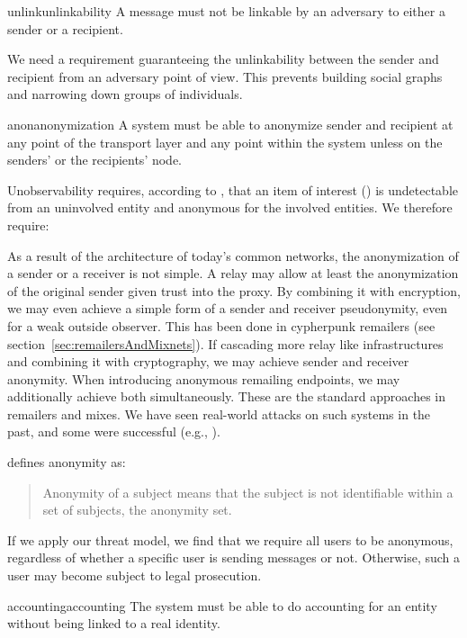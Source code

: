 \begin{requirement}{unlink}{unlinkability}
	A message must not be linkable by an adversary to either a sender or a recipient.
\end{requirement}

We need a requirement guaranteeing the unlinkability between the sender and recipient from an adversary point of view. This prevents building social graphs and narrowing down groups of individuals.

\begin{requirement}{anon}{anonymization}
	A system must be able to anonymize sender and recipient at any point of the transport layer and any point within the system unless on the senders' or the recipients' node.
\end{requirement}

Unobservability requires, according to \cite{anonTerminology}, that an item of interest () is undetectable from an uninvolved entity and anonymous for the involved entities. We therefore require: 

As a result of the architecture of today's common networks, the anonymization of a sender or a receiver is not simple. A relay may allow at least the anonymization of the original sender given trust into the proxy. By combining it with encryption, we may even achieve a simple form of a sender and receiver pseudonymity, even for a weak outside observer. This has been done in cypherpunk remailers (see section~\ref{sec:remailersAndMixnets}). If cascading more relay like infrastructures and combining it with cryptography, we may achieve sender and receiver anonymity. When introducing anonymous remailing endpoints, we may additionally achieve both simultaneously. These are the standard approaches in remailers and mixes. We have seen real-world attacks on such systems in the past, and some were successful (e.g., \cite{penetClosure}). 

\cite{anonTerminology} defines anonymity as:
\begin{quote}
	Anonymity of a subject means that the subject is not identifiable within a set of subjects, the anonymity set.
\end{quote}

If we apply our threat model, we find that we require all users to be anonymous, regardless of whether a specific user is sending messages or not. Otherwise, such a user may become subject to legal prosecution. 

\begin{requirement}{accounting}{accounting}
	The system must be able to do accounting for an entity without being linked to a real identity.
\end{requirement}

